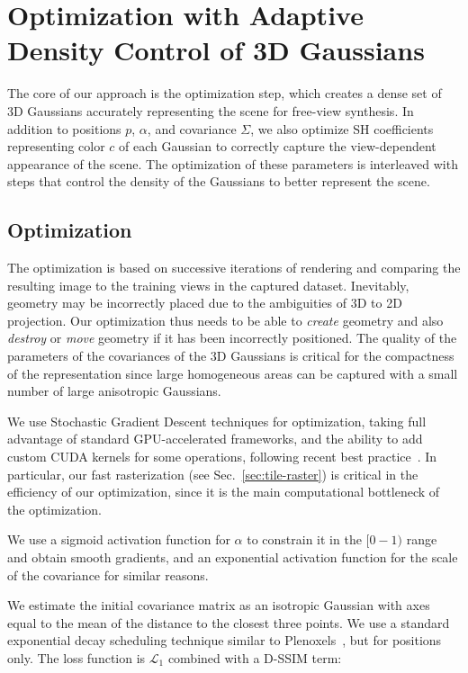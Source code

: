 \section{Optimization with Adaptive Density Control of 3D Gaussians}
\label{sec:opt-dens}


The core of our approach is the optimization step, which creates a dense set of 3D Gaussians accurately representing the scene for free-view synthesis.
In addition to positions $p$, $\alpha$, and covariance $\Sigma$, we also optimize SH coefficients representing color $c$ of each Gaussian to correctly capture the view-dependent appearance of the scene. 
The optimization of these parameters is interleaved with steps that control the density of the Gaussians to better represent the scene.


\subsection{Optimization}

The optimization is based on successive iterations of rendering and comparing the resulting image to the training views in the captured dataset. Inevitably, geometry may be incorrectly placed due to the ambiguities of 3D to 2D projection. Our optimization thus needs to be able to \emph{create} geometry and also \emph{destroy} or \emph{move} geometry if it has been incorrectly positioned. The quality of the parameters of the covariances of the 3D Gaussians is critical for the compactness of the representation since large homogeneous areas can be captured with a small number of large anisotropic Gaussians.

We use Stochastic Gradient Descent techniques for optimization, taking full advantage of standard GPU-accelerated frameworks, and the ability to add custom CUDA kernels for some operations, following recent best practice~\cite{plenoxels,dvgo-cvpr2022}. In particular, our fast rasterization (see Sec.~\ref{sec:tile-raster}) is critical in the efficiency of our optimization, since it is the main computational bottleneck of the optimization.

We use a sigmoid activation function for $\alpha$ to constrain it in the $[0-1)$ range and obtain smooth gradients, and an exponential activation function for the scale of the covariance for similar reasons.




We estimate the initial covariance matrix as an isotropic Gaussian with axes
equal to the mean of the distance to the closest three points. 
We use a standard exponential decay scheduling technique similar to Plenoxels~\cite{plenoxels}, but for positions only. The loss function is $\mathcal{L}_1$ combined with a D-SSIM term:

